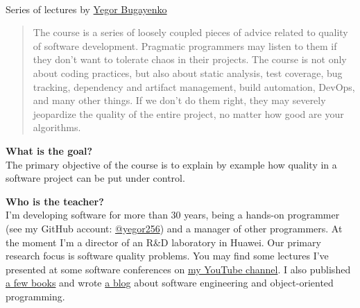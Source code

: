 \documentclass[nobrand,anonymous,nodate,nosecurity]{huawei}
\begin{document}
{\\
Series of lectures by \href{https://www.yegor256.com}{Yegor Bugayenko}


\begin{abstract}
The course is a series of loosely coupled pieces of advice related to quality of software development.
Pragmatic programmers may listen to them if they don't want
to tolerate chaos in their projects. The course is not only about
coding practices, but also about static analysis, test coverage,
bug tracking, dependency and artifact management, build automation,
DevOps, and many other things. If we don't do them right, they may
severely jeopardize the quality of the entire project, no matter
how good are your algorithms.
\end{abstract}


\textbf{What is the goal?}\\
The primary objective of the course is to explain by example how
quality in a software project can be put under control.

\textbf{Who is the teacher?}\\
I'm developing software for more than 30 years, being a hands-on programmer
(see my GitHub account: \href{https://github.com/yegor256}{@yegor256})
and a manager of other programmers. At the moment I'm a director
of an R\&D laboratory in Huawei. Our primary research focus is
software quality problems. You may find some lectures I've presented
at some software conferences on
\href{https://www.youtube.com/channel/UCr9qCdqXLm2SU0BIs6d_68Q}{my YouTube channel}.
I also published \href{https://www.yegor256.com/books.html}{a few books}
and wrote \href{https://www.yegor256.com/contents.html}{a blog} about software engineering
and object-oriented programming.

}
\end{document}
